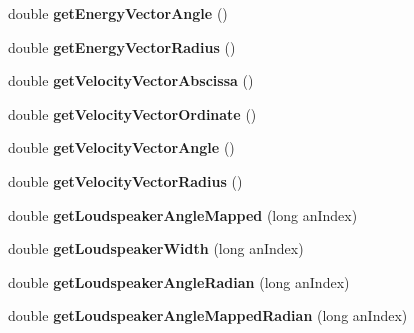 \begin{DoxyCompactItemize}
\item 
\hypertarget{class_ambisonics_meter_a597186413fff3df7e5ee2f82fd0c497a}{double {\bfseries get\-Energy\-Vector\-Angle} ()}\label{class_ambisonics_meter_a597186413fff3df7e5ee2f82fd0c497a}

\item 
\hypertarget{class_ambisonics_meter_a0ed4c04a207ef485252c9075f691be35}{double {\bfseries get\-Energy\-Vector\-Radius} ()}\label{class_ambisonics_meter_a0ed4c04a207ef485252c9075f691be35}

\item 
\hypertarget{class_ambisonics_meter_a1f4ec2a7672144bbeebfedc398e77439}{double {\bfseries get\-Velocity\-Vector\-Abscissa} ()}\label{class_ambisonics_meter_a1f4ec2a7672144bbeebfedc398e77439}

\item 
\hypertarget{class_ambisonics_meter_ab34bc7eff55c357550f05b2852eb6840}{double {\bfseries get\-Velocity\-Vector\-Ordinate} ()}\label{class_ambisonics_meter_ab34bc7eff55c357550f05b2852eb6840}

\item 
\hypertarget{class_ambisonics_meter_a937efec3de37d9702acf18b2b1b00109}{double {\bfseries get\-Velocity\-Vector\-Angle} ()}\label{class_ambisonics_meter_a937efec3de37d9702acf18b2b1b00109}

\item 
\hypertarget{class_ambisonics_meter_a48578aa4790dc7063e9ecb2d37dc66ba}{double {\bfseries get\-Velocity\-Vector\-Radius} ()}\label{class_ambisonics_meter_a48578aa4790dc7063e9ecb2d37dc66ba}

\item 
\hypertarget{class_ambisonics_meter_ad1b0981516635b7773383b498f2a9b39}{double {\bfseries get\-Loudspeaker\-Angle\-Mapped} (long an\-Index)}\label{class_ambisonics_meter_ad1b0981516635b7773383b498f2a9b39}

\item 
\hypertarget{class_ambisonics_meter_a5d01a9986aa9ac1cea65d97c84da49c1}{double {\bfseries get\-Loudspeaker\-Width} (long an\-Index)}\label{class_ambisonics_meter_a5d01a9986aa9ac1cea65d97c84da49c1}

\item 
\hypertarget{class_ambisonics_meter_a72032e205495ad09add249ad65363957}{double {\bfseries get\-Loudspeaker\-Angle\-Radian} (long an\-Index)}\label{class_ambisonics_meter_a72032e205495ad09add249ad65363957}

\item 
\hypertarget{class_ambisonics_meter_ac10c0e4c4c2b3188d084253116edc1b0}{double {\bfseries get\-Loudspeaker\-Angle\-Mapped\-Radian} (long an\-Index)}\label{class_ambisonics_meter_ac10c0e4c4c2b3188d084253116edc1b0}


\end{DoxyCompactItemize}
